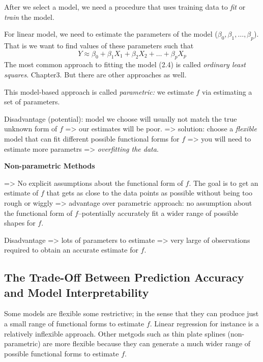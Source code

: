 \documentclass[
  letterpaper,
  DIV=11,
  numbers=noendperiod]{scrreprt}
\begin{document}
After we select a model, we need a procedure that uses training data to
\emph{fit} or \emph{train} the model.

For linear model, we need to estimate the parameters of the model
(\(\beta_0, \beta_1, \dots, \beta_p\)). That is we want to find values
of these parameters such that \[
  Y \approx \beta_0 + \beta_1X_1 + \beta_2X_2 + \dots + \beta_pX_p
  \] The most common approach to fitting the model (2.4) is called
\emph{ordinary least squares}. Chapter3. But there are other approaches
as well.

This model-based approach is called \emph{parametric:} we estimate \(f\)
via estimating a set of parameters.

Disadvantage (potential): model we choose will usually not match the
true unknown form of \(f\) =\textgreater{} our estimates will be poor.
=\textgreater{} solution: choose a \emph{flexible} model that can fit
different possible functional forms for \(f\) =\textgreater{} you will
need to estimate more parametrs =\textgreater{} \emph{overfitting the
data}.

\textbf{Non-parametric Methods}

=\textgreater{} No explicit assumptions about the functional form of
\(f\). The goal is to get an estimate of \(f\) that gets as close to the
data points as possible without being too rough or wiggly
=\textgreater{} advantage over parametric approach: no assumption about
the functional form of \(f\)--potentially accurately fit a wider range
of possible shapes for \(f\).

Disadvantage =\textgreater{} lots of parameters to estimate
=\textgreater{} very large of observations required to obtain an
accurate estimate for \(f\).

\hypertarget{the-trade-off-between-prediction-accuracy-and-model-interpretability}{%
\subsection{The Trade-Off Between Prediction Accuracy and Model
Interpretability}\label{the-trade-off-between-prediction-accuracy-and-model-interpretability}}

Some models are flexible some restrictive; in the sense that they can
produce just a small range of functional forms to estimate \(f\). Linear
regression for instance is a relatively inflexible approach. Other
metgods such as thin plate splines (non-parametric) are more flexible
because they can generate a much wider range of possible functional
forms to estimate \(f\).
\end{document}
